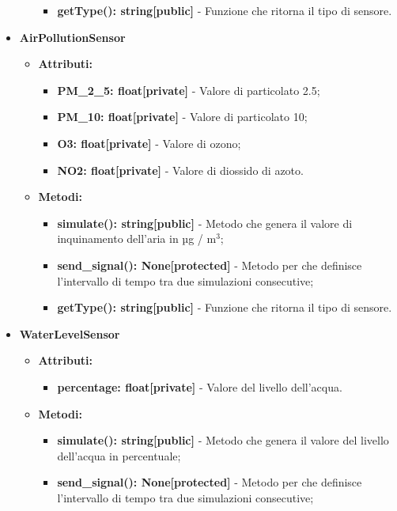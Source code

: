 \documentclass[8pt]{article}
\begin{document}
\begin{itemize}
\begin{itemize}
\begin{itemize}
            \item \textbf{getType(): string[public]} - Funzione che ritorna il tipo di sensore.
        \end{itemize}
    \end{itemize}
    \item \textbf{AirPollutionSensor}
    \begin{itemize}
        \item \textbf{Attributi:}
        \begin{itemize}
            \item \textbf{PM\_2\_5: float[private]} - Valore di particolato 2.5;
            \item \textbf{PM\_10: float[private]} - Valore di particolato 10;
            \item \textbf{O3: float[private]} - Valore di ozono;
            \item \textbf{NO2: float[private]} - Valore di diossido di azoto.
        \end{itemize}
        \item \textbf{Metodi:}
        \begin{itemize}
            \item \textbf{simulate(): string[public]} - Metodo che genera il valore di inquinamento dell'aria in µg / $\mbox{m}^{\mbox{3}}$;
            \item \textbf{send\_signal(): None[protected]} - Metodo per che definisce l'intervallo di tempo tra due simulazioni consecutive;
            \item \textbf{getType(): string[public]} - Funzione che ritorna il tipo di sensore.
        \end{itemize}
    \end{itemize}
    \item \textbf{WaterLevelSensor}
    \begin{itemize}
        \item \textbf{Attributi:}
        \begin{itemize}
            \item \textbf{percentage: float[private]} - Valore del livello dell'acqua.
        \end{itemize}
        \item \textbf{Metodi:}
        \begin{itemize}
            \item \textbf{simulate(): string[public]} - Metodo che genera il valore del livello dell'acqua in percentuale;
            \item \textbf{send\_signal(): None[protected]} - Metodo per che definisce l'intervallo di tempo tra due simulazioni consecutive;

\end{itemize}
\end{itemize}
\end{itemize}
\end{document}
